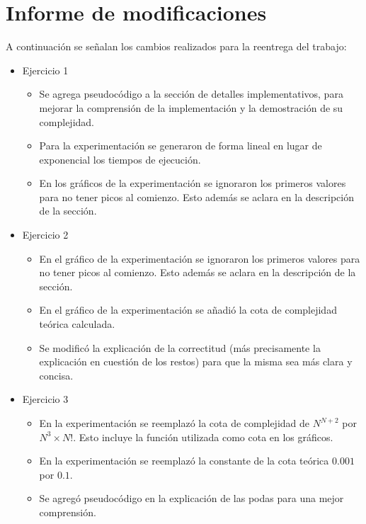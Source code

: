 \section{Informe de modificaciones}

A continuación se señalan los cambios realizados para la reentrega del trabajo:

\begin{itemize}
	\item{
		Ejercicio 1
		\begin{itemize}
			\item Se agrega pseudocódigo a la sección de detalles implementativos, para mejorar
			la comprensión de la implementación y la demostración de su complejidad.
			\item Para la experimentación se generaron de forma lineal en lugar
			de exponencial los tiempos de ejecución.
			\item En los gráficos de la experimentación se ignoraron los primeros
			valores para no tener picos al comienzo. Esto además se aclara en la
			descripción de la sección.
		\end{itemize}
	}
	\item{
		Ejercicio 2
		\begin{itemize}
			\item En el gráfico de la experimentación se ignoraron los primeros
			valores para no tener picos al comienzo. Esto además se aclara en la
			descripción de la sección.
			\item En el gráfico de la experimentación se añadió la cota de complejidad teórica calculada.
			\item Se modificó la explicación de la correctitud (más precisamente la explicación en cuestión de los restos) para que la misma sea más clara y concisa.
		\end{itemize}
	}
	\item{
		Ejercicio 3
		\begin{itemize}
			\item En la experimentación se reemplazó la cota de complejidad de $N^{N+2}$ por $N^3 \times N!$. Esto incluye la función utilizada como cota en los gráficos.
			\item En la experimentación se reemplazó la constante de la cota teórica $0.001$ por $0.1$.
			\item Se agregó pseudocódigo en la explicación de las podas para una mejor comprensión.
		\end{itemize}
	}
\end{itemize}
